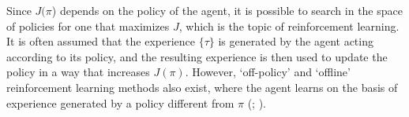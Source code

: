 Since $J(\pi$) depends on the policy of the agent, it is possible to search in the space of policies for one that maximizes $J$, which is the topic of reinforcement learning.
It is often assumed that the experience $\{ \tau \}$ is generated by the agent acting according to its policy, and the resulting experience is then used to update the policy in a way that increases $J(\pi)$.
However, `off-policy' and `offline' reinforcement learning methods also exist, where the agent learns on the basis of experience generated by a policy different from $\pi$ (\citealp{levine2020offline}; ).



